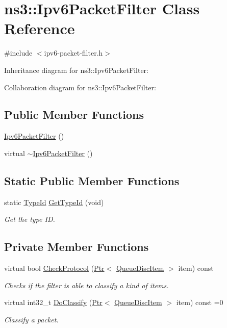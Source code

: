 \hypertarget{classns3_1_1Ipv6PacketFilter}{}\section{ns3\+:\+:Ipv6\+Packet\+Filter Class Reference}
\label{classns3_1_1Ipv6PacketFilter}


{\ttfamily \#include $<$ipv6-\/packet-\/filter.\+h$>$}



Inheritance diagram for ns3\+:\+:Ipv6\+Packet\+Filter\+:


Collaboration diagram for ns3\+:\+:Ipv6\+Packet\+Filter\+:
\subsection*{Public Member Functions}
\begin{DoxyCompactItemize}
\item 
\hyperlink{classns3_1_1Ipv6PacketFilter_a6766895a7a1ef8b9552b814001006c85}{Ipv6\+Packet\+Filter} ()
\item 
virtual \hyperlink{classns3_1_1Ipv6PacketFilter_a79bffbe415d57bcd4e385ce80c4453c0}{$\sim$\+Ipv6\+Packet\+Filter} ()
\end{DoxyCompactItemize}
\subsection*{Static Public Member Functions}
\begin{DoxyCompactItemize}
\item 
static \hyperlink{classns3_1_1TypeId}{Type\+Id} \hyperlink{classns3_1_1Ipv6PacketFilter_a983ea50a53222bf147bda3e1a8ec5258}{Get\+Type\+Id} (void)
\begin{DoxyCompactList}\small\item\em Get the type ID. \end{DoxyCompactList}\end{DoxyCompactItemize}
\subsection*{Private Member Functions}
\begin{DoxyCompactItemize}
\item 
virtual bool \hyperlink{classns3_1_1Ipv6PacketFilter_a23b912a602619dd34deb459d68ffdc28}{Check\+Protocol} (\hyperlink{classns3_1_1Ptr}{Ptr}$<$ \hyperlink{classns3_1_1QueueDiscItem}{Queue\+Disc\+Item} $>$ item) const 
\begin{DoxyCompactList}\small\item\em Checks if the filter is able to classify a kind of items. \end{DoxyCompactList}\item 
virtual int32\+\_\+t \hyperlink{classns3_1_1Ipv6PacketFilter_ae705e3336b81cbcf09cc686b3148241b}{Do\+Classify} (\hyperlink{classns3_1_1Ptr}{Ptr}$<$ \hyperlink{classns3_1_1QueueDiscItem}{Queue\+Disc\+Item} $>$ item) const =0
\begin{DoxyCompactList}\small\item\em Classify a packet. \end{DoxyCompactList}\end{DoxyCompactItemize}
